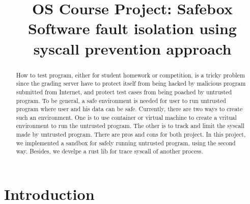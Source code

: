 \documentclass[conference,compsoc]{IEEEtran}
\begin{document}
\title{
	OS Course Project: Safebox\\ 
	Software fault isolation using syscall prevention approach
}


\author{
\and
}

\maketitle

\begin{abstract}
	How to test program, either for student homework or competition, is a tricky problem since the grading server have to protect itself from being hacked by malicious program submitted from Internet, and protect test cases from being poached by untrusted program. 
	To be general, a safe environment is needed for user to run untrusted program where user and his data can be safe. 
	Currently, there are two ways to create such an environment. 
	One is to use container or virtual machine to create a vritual environment to run the untrusted program. The other is to track and limit the syscall made by untrusted program. 
	There are pros and cons for both project.
	In this project, we implemented a sandbox for safely running untrusted program, using the second way. 
	Besides, we develpe a rust lib for trace syscall of another process.
\end{abstract}

\section{Introduction}
\end{document}
